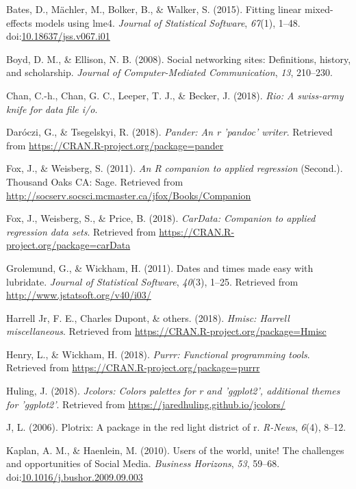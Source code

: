 \documentclass[man]{apa6}
\theoremstyle{definition}
\theoremstyle{definition}
\theoremstyle{definition}
\theoremstyle{remark}
\begin{document}
\hypertarget{ref-R-lme4}{}
Bates, D., Mächler, M., Bolker, B., \& Walker, S. (2015). Fitting linear
mixed-effects models using lme4. \emph{Journal of Statistical Software},
\emph{67}(1), 1--48.
doi:\href{https://doi.org/10.18637/jss.v067.i01}{10.18637/jss.v067.i01}

\hypertarget{ref-Boyd2008}{}
Boyd, D. M., \& Ellison, N. B. (2008). Social networking sites:
Definitions, history, and scholarship. \emph{Journal of
Computer-Mediated Communication}, \emph{13}, 210--230.

\hypertarget{ref-R-rio}{}
Chan, C.-h., Chan, G. C., Leeper, T. J., \& Becker, J. (2018).
\emph{Rio: A swiss-army knife for data file i/o}.

\hypertarget{ref-R-pander}{}
Daróczi, G., \& Tsegelskyi, R. (2018). \emph{Pander: An r 'pandoc'
writer}. Retrieved from \url{https://CRAN.R-project.org/package=pander}

\hypertarget{ref-R-car}{}
Fox, J., \& Weisberg, S. (2011). \emph{An R companion to applied
regression} (Second.). Thousand Oaks CA: Sage. Retrieved from
\url{http://socserv.socsci.mcmaster.ca/jfox/Books/Companion}

\hypertarget{ref-R-carData}{}
Fox, J., Weisberg, S., \& Price, B. (2018). \emph{CarData: Companion to
applied regression data sets}. Retrieved from
\url{https://CRAN.R-project.org/package=carData}

\hypertarget{ref-R-lubridate}{}
Grolemund, G., \& Wickham, H. (2011). Dates and times made easy with
lubridate. \emph{Journal of Statistical Software}, \emph{40}(3), 1--25.
Retrieved from \url{http://www.jstatsoft.org/v40/i03/}

\hypertarget{ref-R-Hmisc}{}
Harrell Jr, F. E., Charles Dupont, \& others. (2018). \emph{Hmisc:
Harrell miscellaneous}. Retrieved from
\url{https://CRAN.R-project.org/package=Hmisc}

\hypertarget{ref-R-purrr}{}
Henry, L., \& Wickham, H. (2018). \emph{Purrr: Functional programming
tools}. Retrieved from \url{https://CRAN.R-project.org/package=purrr}

\hypertarget{ref-R-jcolors}{}
Huling, J. (2018). \emph{Jcolors: Colors palettes for r and 'ggplot2',
additional themes for 'ggplot2'}. Retrieved from
\url{https://jaredhuling.github.io/jcolors/}

\hypertarget{ref-R-plotrix}{}
J, L. (2006). Plotrix: A package in the red light district of r.
\emph{R-News}, \emph{6}(4), 8--12.

\hypertarget{ref-Kaplan2010}{}
Kaplan, A. M., \& Haenlein, M. (2010). Users of the world, unite! The
challenges and opportunities of Social Media. \emph{Business Horizons},
\emph{53}, 59--68.
doi:\href{https://doi.org/10.1016/j.bushor.2009.09.003}{10.1016/j.bushor.2009.09.003}
\end{document}
